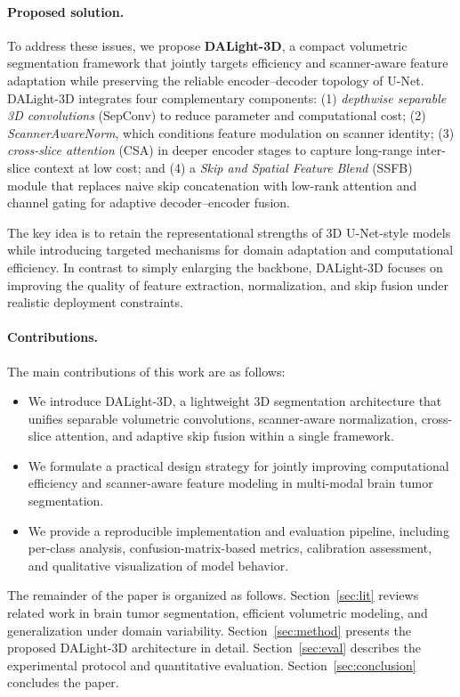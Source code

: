 \documentclass[conference]{IEEEtran}
\begin{document}
\paragraph{Proposed solution.}
To address these issues, we propose \textbf{DALight-3D}, a compact volumetric segmentation framework that jointly targets efficiency and scanner-aware feature adaptation while preserving the reliable encoder--decoder topology of U-Net. DALight-3D integrates four complementary components: (1) \emph{depthwise separable 3D convolutions} (SepConv) to reduce parameter and computational cost; (2) \emph{ScannerAwareNorm}, which conditions feature modulation on scanner identity; (3) \emph{cross-slice attention} (CSA) in deeper encoder stages to capture long-range inter-slice context at low cost; and (4) a \emph{Skip and Spatial Feature Blend} (SSFB) module that replaces naive skip concatenation with low-rank attention and channel gating for adaptive decoder--encoder fusion.

The key idea is to retain the representational strengths of 3D U-Net-style models while introducing targeted mechanisms for domain adaptation and computational efficiency. In contrast to simply enlarging the backbone, DALight-3D focuses on improving the quality of feature extraction, normalization, and skip fusion under realistic deployment constraints.

\paragraph{Contributions.}
The main contributions of this work are as follows:
\begin{itemize}
\item We introduce DALight-3D, a lightweight 3D segmentation architecture that unifies separable volumetric convolutions, scanner-aware normalization, cross-slice attention, and adaptive skip fusion within a single framework.
\item We formulate a practical design strategy for jointly improving computational efficiency and scanner-aware feature modeling in multi-modal brain tumor segmentation.
\item We provide a reproducible implementation and evaluation pipeline, including per-class analysis, confusion-matrix-based metrics, calibration assessment, and qualitative visualization of model behavior.
\end{itemize}

The remainder of the paper is organized as follows. Section~\ref{sec:lit} reviews related work in brain tumor segmentation, efficient volumetric modeling, and generalization under domain variability. Section~\ref{sec:method} presents the proposed DALight-3D architecture in detail. Section~\ref{sec:eval} describes the experimental protocol and quantitative evaluation. Section~\ref{sec:conclusion} concludes the paper.
\end{document}
